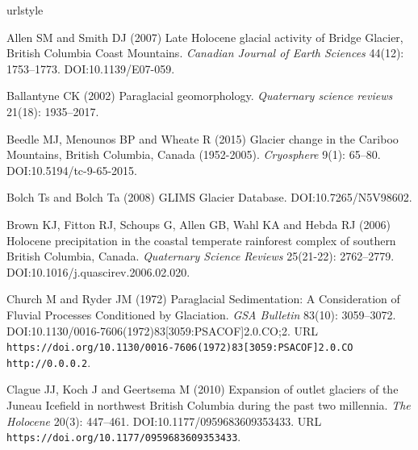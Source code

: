 \documentclass[Royal,times,doublespace,sageh]{sagej}
\begin{document}
\pagebreak


\begin{thebibliography}{68}
\providecommand{\natexlab}[1]{#1}
\providecommand{\url}[1]{\texttt{#1}}
\providecommand{\urlprefix}{URL }
\expandafter\ifx\csname urlstyle\endcsname\relax
  \providecommand{\doi}[1]{DOI:\discretionary{}{}{}#1}\else
  \providecommand{\doi}{DOI:\discretionary{}{}{}\begingroup
  \urlstyle{rm}\Url}\fi

Allen SM and Smith DJ (2007) {Late Holocene glacial activity of Bridge Glacier,
  British Columbia Coast Mountains}.
\newblock \emph{Canadian Journal of Earth Sciences} 44(12): 1753--1773.
\newblock \doi{10.1139/E07-059}.

Ballantyne CK (2002) {Paraglacial geomorphology}.
\newblock \emph{Quaternary science reviews} 21(18): 1935--2017.

Beedle MJ, Menounos BP and Wheate R (2015) {Glacier change in the Cariboo
  Mountains, British Columbia, Canada (1952-2005)}.
\newblock \emph{Cryosphere} 9(1): 65--80.
\newblock \doi{10.5194/tc-9-65-2015}.

Bolch Ts and Bolch Ta (2008) {GLIMS Glacier Database}.
\newblock \doi{10.7265/N5V98602}.

Brown KJ, Fitton RJ, Schoups G, Allen GB, Wahl KA and Hebda RJ (2006) {Holocene
  precipitation in the coastal temperate rainforest complex of southern British
  Columbia, Canada}.
\newblock \emph{Quaternary Science Reviews} 25(21-22): 2762--2779.
\newblock \doi{10.1016/j.quascirev.2006.02.020}.

Church M and Ryder JM (1972) {Paraglacial Sedimentation: A Consideration of
  Fluvial Processes Conditioned by Glaciation}.
\newblock \emph{GSA Bulletin} 83(10): 3059--3072.
\newblock \doi{10.1130/0016-7606(1972)83[3059:PSACOF]2.0.CO;2}.
\newblock
  \urlprefix\url{https://doi.org/10.1130/0016-7606(1972)83[3059:PSACOF]2.0.CO
  http://0.0.0.2}.

Clague JJ, Koch J and Geertsema M (2010) {Expansion of outlet glaciers of the
  Juneau Icefield in northwest British Columbia during the past two millennia}.
\newblock \emph{The Holocene} 20(3): 447--461.
\newblock \doi{10.1177/0959683609353433}.
\newblock \urlprefix\url{https://doi.org/10.1177/0959683609353433}.


\end{thebibliography}
\end{document}
